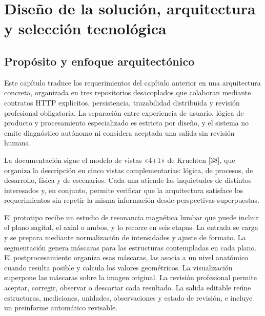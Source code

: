 \chapter{Diseño de la solución, arquitectura y selección tecnológica}
\label{chap:diseno-arquitectura}

\section{Propósito y enfoque arquitectónico}

Este capítulo traduce los requerimientos del capítulo anterior en una arquitectura concreta, organizada en tres repositorios desacoplados que colaboran mediante contratos HTTP explícitos, persistencia, trazabilidad distribuida y revisión profesional obligatoria. La separación entre experiencia de usuario, lógica de producto y procesamiento especializado es estricta por diseño, y el sistema no emite diagnóstico autónomo ni considera aceptada una salida sin revisión humana.

La documentación sigue el modelo de vistas «4+1» de Kruchten [38], que organiza la descripción en cinco vistas complementarias: lógica, de procesos, de desarrollo, física y de escenarios. Cada una atiende las inquietudes de distintos interesados y, en conjunto, permite verificar que la arquitectura satisface los requerimientos sin repetir la misma información desde perspectivas superpuestas.


El prototipo recibe un estudio de resonancia magnética lumbar que puede incluir el plano sagital, el axial o ambos, y lo recorre en seis etapas. La entrada se carga y se prepara mediante normalización de intensidades y ajuste de formato. La segmentación genera máscaras para las estructuras contempladas en cada plano. El postprocesamiento organiza esas máscaras, las asocia a un nivel anatómico cuando resulta posible y calcula los valores geométricos. La visualización superpone las máscaras sobre la imagen original. La revisión profesional permite aceptar, corregir, observar o descartar cada resultado. La salida editable reúne estructuras, mediciones, unidades, observaciones y estado de revisión, e incluye un preinforme automático revisable.

